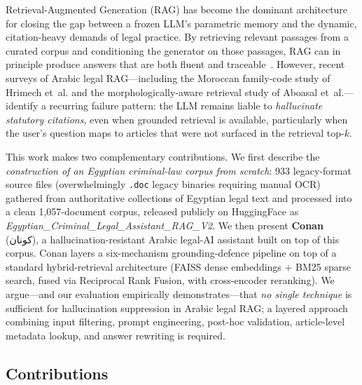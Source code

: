 \documentclass[final,1p,times]{elsarticle}
\newcommand{\ar}[1]{{\arabicfont\beginR #1\endR}}
\begin{document}
Retrieval-Augmented Generation (RAG) has become the dominant architecture for
closing the gap between a frozen LLM's parametric memory and the dynamic,
citation-heavy demands of legal practice. By retrieving relevant passages
from a curated corpus and conditioning the generator on those passages, RAG
can in principle produce answers that are both fluent and
traceable~\cite{hrimech2025,miniraq}. However, recent surveys of Arabic legal
RAG---including the Moroccan family-code study of Hrimech et~al.\cite{hrimech2025}
and the morphologically-aware retrieval study of Aboasal et~al.\cite{aboasal2025}---identify
a recurring failure pattern: the LLM remains liable to \emph{hallucinate
statutory citations}, even when grounded retrieval is available, particularly
when the user's question maps to articles that were not surfaced in the
retrieval top-$k$.

This work makes two complementary contributions. We first describe the
\emph{construction of an Egyptian criminal-law corpus from scratch}: 933
legacy-format source files (overwhelmingly \texttt{.doc} legacy binaries
requiring manual OCR) gathered from authoritative collections of Egyptian
legal text and processed into a clean 1{,}057-document corpus, released
publicly on HuggingFace as \emph{Egyptian\_Criminal\_Legal\_Assistant\_RAG\_V2}.
We then present \textbf{Conan} (\ar{كونان}), a hallucination-resistant Arabic
legal-AI assistant built on top of this corpus. Conan layers a six-mechanism
grounding-defence pipeline on top of a standard hybrid-retrieval architecture
(FAISS dense embeddings + BM25 sparse search, fused via Reciprocal Rank
Fusion, with cross-encoder reranking). We argue---and our evaluation
empirically demonstrates---that \emph{no single technique} is sufficient for
hallucination suppression in Arabic legal RAG; a layered approach combining
input filtering, prompt engineering, post-hoc validation, article-level
metadata lookup, and answer rewriting is required.

\subsection{Contributions}
\end{document}
